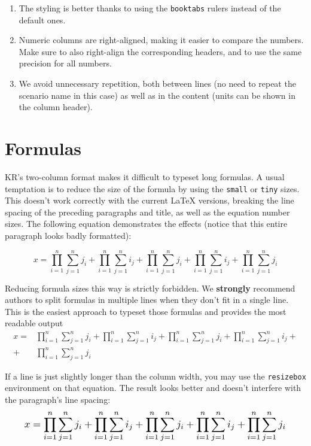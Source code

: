 \documentclass{article}
\begin{document}
\begin{enumerate}
\item The styling is better thanks to using the \texttt{booktabs} rulers
  instead of the default ones.
\item Numeric columns are right-aligned, making it easier to compare the
  numbers. Make sure to also right-align the corresponding headers, and to use
  the same precision for all numbers.
\item We avoid unnecessary repetition, both between lines (no need to repeat
  the scenario name in this case) as well as in the content (units can be shown
  in the column header).
\end{enumerate}

\section{Formulas}

KR's two-column format makes it difficult to typeset long formulas. A usual
temptation is to reduce the size of the formula by using the \texttt{small} or
\texttt{tiny} sizes. This doesn't work correctly with the current \LaTeX{}
versions, breaking the line spacing of the preceding paragraphs and title, as
well as the equation number sizes. The following equation demonstrates the
effects (notice that this entire paragraph looks badly formatted):
%
\begin{tiny}
\begin{equation}
    x = \prod_{i=1}^n \sum_{j=1}^n j_i + \prod_{i=1}^n \sum_{j=1}^n i_j + \prod_{i=1}^n \sum_{j=1}^n j_i + \prod_{i=1}^n \sum_{j=1}^n i_j + \prod_{i=1}^n \sum_{j=1}^n j_i
\end{equation}
\end{tiny}%

Reducing formula sizes this way is strictly forbidden. We \textbf{strongly}
recommend authors to split formulas in multiple lines when they don't fit in a
single line. This is the easiest approach to typeset those formulas and
provides the most readable output%
%
\begin{align}
    x =& \prod_{i=1}^n \sum_{j=1}^n j_i + \prod_{i=1}^n \sum_{j=1}^n i_j + \prod_{i=1}^n \sum_{j=1}^n j_i + \prod_{i=1}^n \sum_{j=1}^n i_j + \nonumber\\
    + & \prod_{i=1}^n \sum_{j=1}^n j_i
\end{align}%

If a line is just slightly longer than the column width, you may use the
\texttt{resizebox} environment on that equation. The result looks better and
doesn't interfere with the paragraph's line spacing: %
\begin{equation}
\resizebox{.91\linewidth}{!}{$
    \displaystyle
    x = \prod_{i=1}^n \sum_{j=1}^n j_i + \prod_{i=1}^n \sum_{j=1}^n i_j + \prod_{i=1}^n \sum_{j=1}^n j_i + \prod_{i=1}^n \sum_{j=1}^n i_j + \prod_{i=1}^n \sum_{j=1}^n j_i
$}
\end{equation}%
\end{document}
